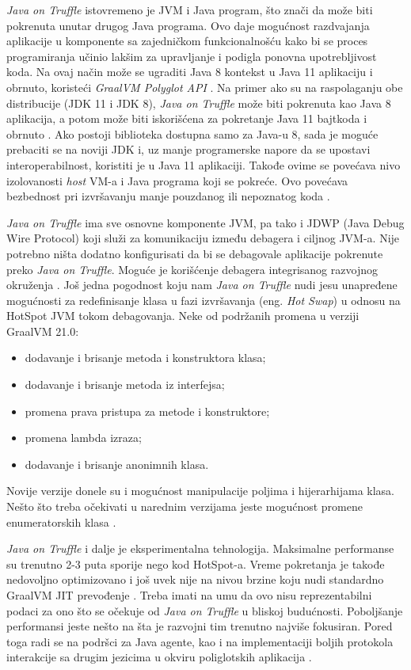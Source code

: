 \documentclass[a4paper]{article}
\begin{document}
\emph{Java on Truffle} istovremeno je JVM i Java program, što znači da može biti pokrenuta unutar drugog Java programa. Ovo daje mogućnost razdvajanja aplikacije u komponente sa zajedničkom funkcionalnošću kako bi se proces programiranja učinio lakšim za upravljanje i podigla ponovna upotrebljivost koda. Na ovaj način može se ugraditi Java 8 kontekst u Java 11 aplikaciju i obrnuto, koristeći \emph{GraalVM Polyglot API} \cite{graalvm}. Na primer ako su na raspolaganju obe distribucije (JDK 11 i JDK 8),
\emph{Java on Truffle} može biti pokrenuta kao Java 8 aplikacija, a potom može biti iskorišćena za pokretanje Java 11 bajtkoda i obrnuto \cite{grooteman2017java}. Ako postoji biblioteka dostupna samo za Java-u 8, sada je moguće prebaciti se na noviji JDK i, uz manje programerske napore da se upostavi interoperabilnost, koristiti je u Java 11 aplikaciji. Takođe ovime se povećava nivo izolovanosti \emph{host} VM-a i Java programa koji se pokreće. Ovo povećava bezbednost pri izvršavanju manje pouzdanog ili nepoznatog koda \cite{graalvm}.

\emph{Java on Truffle} ima sve osnovne komponente JVM, pa tako i JDWP (Java Debug Wire Protocol) koji služi za komunikaciju između debagera i ciljnog JVM-a. Nije potrebno ništa dodatno konfigurisati da bi se debagovale aplikacije pokrenute preko \emph{Java on Truffle}. Moguće je korišćenje debagera integrisanog razvojnog okruženja \cite{graalvm}. Još jedna pogodnost koju nam \emph{Java on Truffle} nudi jesu unapređene mogućnosti za redefinisanje klasa u fazi izvršavanja (eng. \emph{Hot Swap}) u odnosu na HotSpot JVM tokom debagovanja. Neke od podržanih promena u verziji GraalVM 21.0:
\begin{itemize}
    \item dodavanje i brisanje metoda i konstruktora klasa;
    \item dodavanje i brisanje metoda iz interfejsa;
    \item promena prava pristupa za metode i konstruktore;
    \item promena lambda izraza;
    \item dodavanje i brisanje anonimnih klasa.
\end{itemize}
Novije verzije donele su i mogućnost manipulacije poljima i hijerarhijama klasa. Nešto što treba očekivati u narednim verzijama jeste mogućnost promene enumeratorskih klasa \cite{graalvm}.

\emph{Java on Truffle} i dalje je eksperimentalna tehnologija. Maksimalne performanse su trenutno 2-3 puta sporije nego kod HotSpot-a. Vreme pokretanja je takođe nedovoljno optimizovano i još uvek nije na nivou brzine koju nudi standardno GraalVM JIT prevođenje \cite{graalvm}. Treba imati na umu da ovo nisu reprezentabilni podaci za ono što se očekuje od \emph{Java on Truffle} u bliskoj budućnosti. Poboljšanje performansi jeste nešto na šta je razvojni tim trenutno najviše fokusiran. Pored toga radi se na podršci za Java agente, kao i na implementaciji boljih protokola interakcije sa drugim jezicima u okviru poliglotskih aplikacija \cite{graalvm}.
\end{document}
